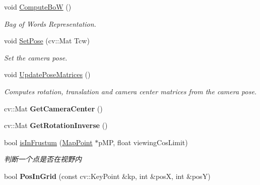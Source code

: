 \begin{DoxyCompactItemize}
\item 
void \hyperlink{classORB__SLAM2_1_1Frame_ac748d2318f9a409406dba4910ff5ef8e}{Compute\-Bo\-W} ()
\begin{DoxyCompactList}\small\item\em Bag of Words Representation. \end{DoxyCompactList}\item 
void \hyperlink{classORB__SLAM2_1_1Frame_a95cf2ea68735ef3e8c2d820eada11bf4}{Set\-Pose} (cv\-::\-Mat Tcw)
\begin{DoxyCompactList}\small\item\em Set the camera pose. \end{DoxyCompactList}\item 
void \hyperlink{classORB__SLAM2_1_1Frame_a0a18d3024a23f6fa2cab9c7d987598c2}{Update\-Pose\-Matrices} ()
\begin{DoxyCompactList}\small\item\em Computes rotation, translation and camera center matrices from the camera pose. \end{DoxyCompactList}\item 
\hypertarget{classORB__SLAM2_1_1Frame_a48c8983df3a521ed7439d9654b28e390}{cv\-::\-Mat {\bfseries Get\-Camera\-Center} ()}\label{classORB__SLAM2_1_1Frame_a48c8983df3a521ed7439d9654b28e390}

\item 
\hypertarget{classORB__SLAM2_1_1Frame_a96ec2c272f2ecea3f94b8472add80478}{cv\-::\-Mat {\bfseries Get\-Rotation\-Inverse} ()}\label{classORB__SLAM2_1_1Frame_a96ec2c272f2ecea3f94b8472add80478}

\item 
bool \hyperlink{classORB__SLAM2_1_1Frame_a0929e100e3380dba1baba12dfa8904c4}{is\-In\-Frustum} (\hyperlink{classORB__SLAM2_1_1MapPoint}{Map\-Point} $\ast$p\-M\-P, float viewing\-Cos\-Limit)
\begin{DoxyCompactList}\small\item\em 判断一个点是否在视野内 \end{DoxyCompactList}\item 
\hypertarget{classORB__SLAM2_1_1Frame_ae2bc4b1482d2010511da5423d298c9bd}{bool {\bfseries Pos\-In\-Grid} (const cv\-::\-Key\-Point \&kp, int \&pos\-X, int \&pos\-Y)}\label{classORB__SLAM2_1_1Frame_ae2bc4b1482d2010511da5423d298c9bd}


\end{DoxyCompactItemize}
